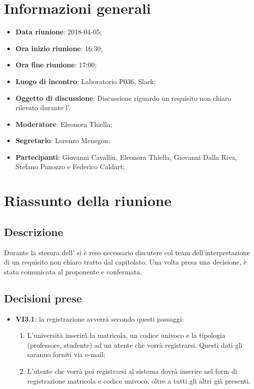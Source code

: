 \section{Informazioni generali}
	\begin{itemize}
		\item \textbf{Data riunione}: 2018-04-05;
		\item \textbf{Ora inizio riunione}: 16:30;
		\item \textbf{Ora fine riunione}: 17:00;
		\item \textbf{Luogo di incontro}: Laboratorio P036, Slack;
		\item \textbf{Oggetto di discussione}: Discussione riguardo un requisito non chiaro rilevato durante l'\AdR{}.
		\item \textbf{Moderatore}: Eleonora Thiella;
		\item \textbf{Segretario}: Lorenzo Menegon;
		\item \textbf{Partecipanti}: Giovanni Cavallin, Eleonora Thiella, Giovanni Dalla Riva, Stefano Panozzo e Federico Caldart;
	\end{itemize}

\section{Riassunto della riunione}
	\subsection{Descrizione}
	Durante la stesura dell'\AdR{} si è reso necessario discutere col team dell'interpretazione di un requisito non chiaro tratto dal capitolato. Una volta presa una decisione, è stata comunicata al proponente e confermata.
	\subsection{Decisioni prese}
		\begin{itemize}
			\item \textbf{VI3.1}: la registrazione avverrà secondo questi passaggi:
			\begin{enumerate}
				\item L'università inserirà la matricola, un codice univoco e la tipologia (professore, studente) ad un utente che vorrà registrarsi. Questi dati gli saranno forniti via e-mail;
				\item L'utente che vorrà poi registrarsi al sistema dovrà inserire nel form di registrazione matricola e codice univoco, oltre a tutti gli altri già presenti.
			\end{enumerate}
		\end{itemize}

